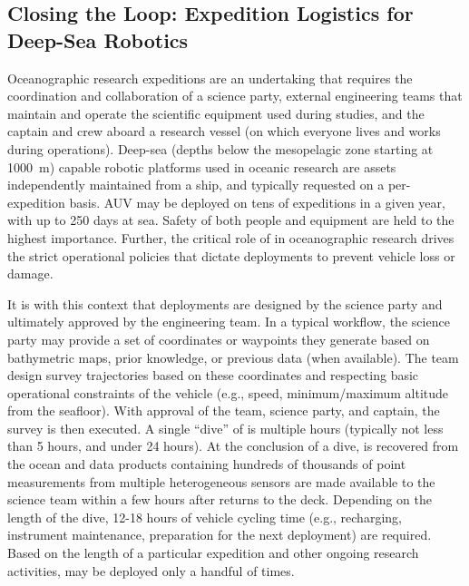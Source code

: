 \subsection{Closing the Loop: Expedition Logistics for Deep-Sea Robotics}
Oceanographic research expeditions are an undertaking that requires the coordination and collaboration of a science party, external engineering teams that maintain and operate the scientific equipment used during studies, and the captain and crew aboard a research vessel (on which everyone lives and works during operations). Deep-sea (depths below the mesopelagic zone starting at \SI{1000}{\meter}) capable robotic platforms used in oceanic research are assets independently maintained from a ship, and typically requested on a per-expedition basis. AUV \Sentry may be deployed on tens of expeditions in a given year, with up to 250 days at sea. Safety of both people and equipment are held to the highest importance. Further, the critical role of \Sentry in oceanographic research drives the strict operational policies that dictate \Sentry deployments to prevent vehicle loss or damage.

It is with this context that \Sentry deployments are designed by the science party and ultimately approved by the \Sentry engineering team. In a typical workflow, the science party may provide a set of coordinates or waypoints they generate based on bathymetric maps, prior knowledge, or previous data (when available). The \Sentry team design survey trajectories based on these coordinates and respecting basic operational constraints of the vehicle (e.g., speed, minimum/maximum altitude from the seafloor). With approval of the \Sentry team, science party, and captain, the survey is then executed. A single ``dive'' of \Sentry is multiple hours (typically not less than 5 hours, and under 24 hours). At the conclusion of a dive, \Sentry is recovered from the ocean and data products containing hundreds of thousands of point measurements from multiple heterogeneous sensors are made available to the science team within a few hours after \Sentry returns to the deck. Depending on the length of the dive, 12-18 hours of vehicle cycling time (e.g., recharging, instrument maintenance, preparation for the next deployment) are required. Based on the length of a particular expedition and other ongoing research activities, \Sentry may be deployed only a handful of times.

